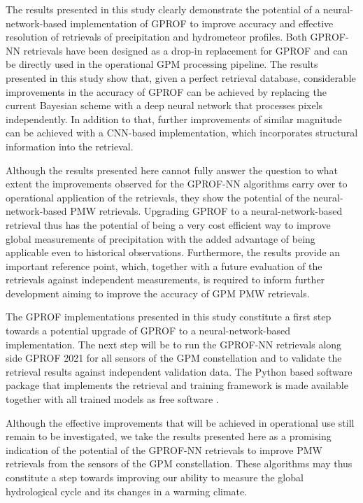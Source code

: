 \documentclass[journal abbreviation, manuscript]{copernicus}
\begin{document}
\conclusions  %

The results presented in this study clearly demonstrate the potential of a
neural-network-based implementation of GPROF to improve accuracy and
effective resolution of retrievals of precipitation and hydrometeor profiles.
Both GPROF-NN retrievals have been designed as a drop-in replacement for GPROF
and can be directly used in the operational GPM processing pipeline. The results
presented in this study show that, given a perfect retrieval database,
considerable improvements in the accuracy of GPROF can be achieved  by
replacing the current Bayesian scheme with a deep neural network that processes
pixels independently. In addition to that, further improvements of similar
magnitude can be achieved with a CNN-based implementation, which incorporates
structural information into the retrieval.

Although the results presented here cannot fully answer the question to what
extent the improvements observed for the GPROF-NN algorithms carry over to
operational application of the retrievals, they show the potential of the
neural-network-based PMW retrievals. Upgrading GPROF to a neural-network-based
retrieval thus has the potential of being a very cost efficient way to improve
global measurements of precipitation with the added advantage of being
applicable even to historical observations. Furthermore, the results provide an
important reference point, which, together with a future evaluation of the
retrievals against independent measurements, is required to inform further
development aiming to improve the accuracy of GPM PMW retrievals.

The GPROF implementations presented in this study constitute a first step
towards a potential upgrade of GPROF to a neural-network-based implementation.
The next step will be to run the GPROF-NN retrievals along side GPROF 2021 for
all sensors of the GPM constellation and to validate the retrieval results
against independent validation data. The Python based software package that
implements the retrieval and training framework is made available together with
all trained models as free software \citep{gprof_nn}.

Although the effective improvements that will be achieved in operational use
still remain to be investigated, we take the results presented here as a
promising indication of the potential of the GPROF-NN retrievals to improve PMW
retrievals from the sensors of the GPM constellation. These algorithms may thus
constitute a step towards improving our ability to measure the global
hydrological cycle and its changes in a warming climate.
\end{document}
